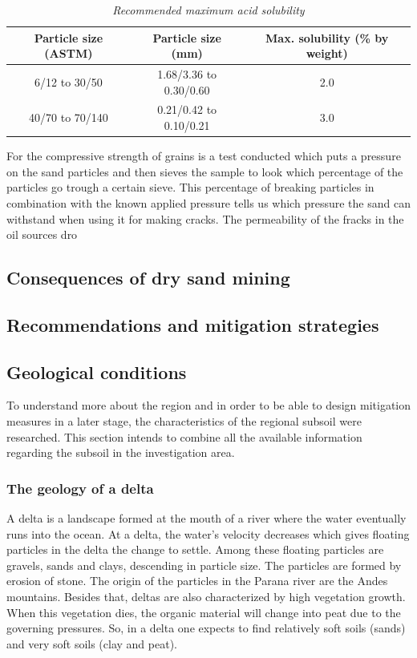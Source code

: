 \begin{table}[h!]
\centering
\begin{tabular}{|c|c|c|}
\hline
\textbf{Particle size (ASTM)} & \textbf{Particle size (mm)} & \textbf{Max. solubility (\% by weight)} \\ \hline
6/12 to 30/50 & 1.68/3.36 to 0.30/0.60 & 2.0 \\ \hline
40/70 to 70/140 & 0.21/0.42 to 0.10/0.21 & 3.0 \\ \hline
\end{tabular}
\caption{\textit{Recommended maximum acid solubility}}
\label{tab:acid}
\end{table}

For the compressive strength of grains is a test conducted which puts a pressure on the sand particles and then sieves the sample to look which percentage of the particles go trough a certain sieve. This percentage of breaking particles in combination with the known applied pressure tells us which pressure the sand can withstand when using it for making cracks.
The permeability of the fracks in the oil sources dro


\subsection{Consequences of dry sand mining}

\subsection{Recommendations and mitigation strategies}

\subsection{Geological conditions}
To understand more about the region and in order to be able to design mitigation measures in a later stage, the characteristics of the regional subsoil were researched. This section intends to combine all the available information regarding the subsoil in the investigation area.

\subsubsection{The geology of a delta}
A delta is a landscape formed at the mouth of a river where the water eventually runs into the ocean. At a delta, the water's velocity decreases which gives floating particles in the delta the change to settle. Among these floating particles are gravels, sands and clays, descending in particle size. The particles are formed by erosion of stone. The origin of the particles in the Parana river are the Andes mountains. 
Besides that, deltas are also characterized by high vegetation growth. When this vegetation dies, the organic material will change into peat due to the governing pressures. So, in a delta one expects to find relatively soft soils (sands) and very soft soils (clay and peat).

